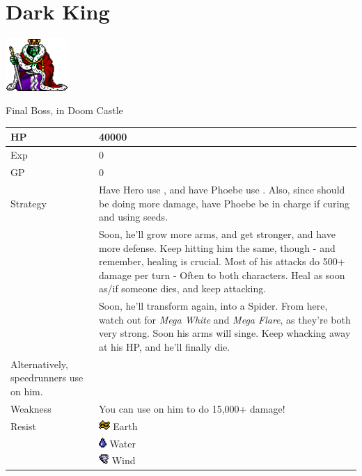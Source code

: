 \section{Dark King}
\label{monster:dark_king}

\includegraphics[height=2cm,keepaspectratio]{./resources/monster/dark_king}

Final Boss, in Doom Castle

\begin{longtable}{ l p{9cm} }
	HP
	& 40000
\\ \hline
	Exp
	& 0
\\ \hline
	GP
	& 0
\\ \hline
	Strategy
	& Have Hero use \nameref{spell:flare}, and have Phoebe use \nameref{spell:white}. Also, since \nameref{spell:flare} should be doing more damage, have Phoebe be in charge if curing and using seeds. \\
	& Soon, he'll grow more arms, and get stronger, and have more defense. Keep hitting him the same, though - and remember, healing is crucial. Most of his attacks do 500+ damage per turn - Often to both characters. Heal as soon as/if someone dies, and keep attacking. \\
	& Soon, he'll transform again, into a Spider. From here, watch out for \textit{Mega White} and \textit{Mega Flare}, as they're both very strong. Soon his arms will singe. Keep whacking away at his HP, and he'll finally die. \\
	Alternatively, speedrunners use \nameref{spell:cure} on him.
\\ \hline
	Weakness
	& You can use \nameref{spell:cure} on him to do 15,000+ damage!
\\ \hline
	Resist
	& \includegraphics[height=1em,keepaspectratio]{./resources/effects/earth} Earth \\
	& \includegraphics[height=1em,keepaspectratio]{./resources/effects/water} Water \\
	& \includegraphics[height=1em,keepaspectratio]{./resources/effects/wind} Wind

\end{longtable}
